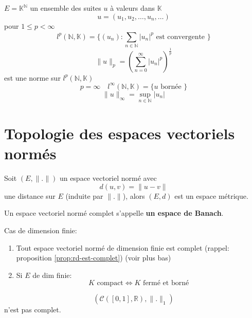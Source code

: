 \documentclass[a4paper]{report}
\newcommand\N{\ensuremath{\mathbb{N}}}
\newcommand\R{\ensuremath{\mathbb{R}}}
\let\iff\Leftrightarrow
\theoremstyle{definition}
\begin{document}
\begin{eg}
    $E = \mathbb{K}^{\N}$ un ensemble des suites $u$ à valeurs dans  $\mathbb{K}$ 
    \[
    u = (u_1, u_2, \ldots, u_n, \ldots )
    \] 
    pour $1 \le p < \infty$
    \[
        l^{p}(\N, \mathbb{K}) = \{(u_n): \sum_{n \in \N}^{} |u_n|^{p} \text{ est convergente } \}
    \] 
    \[
        \|u\|_p = \left( \sum_{n=0}^{\infty} |u_n|^{p} \right)^{\frac{1}{p}}
    \] 
    est une norme sur $l^{p}(\N, \mathbb{K})$
    \[
        p = \infty \quad l^{\infty}(\N, \mathbb{K}) = \{u \text{ bornée } \}
    \] 
    \[
        \|u\|_{\infty} = \sup_{n \in \N} |u_n|
    \] 
\end{eg}
\section{Topologie des espaces vectoriels normés}
\begin{prop}
    Soit $(E, \| . \|)$ un espace vectoriel normé avec 
     \[
    d(u, v) = \|u - v\|
    \] 
    une distance sur $E$ (induite par $\| . \|$), alors  $(E, d)$ est un espace métrique.
\end{prop}
\begin{definition}
    Un espace vectoriel normé complet s'appelle \textbf{un espace de Banach}.
\end{definition}
Cas de dimension finie:
\begin{enumerate}
    \item Tout espace vectoriel normé de dimension finie est complet (rappel: proposition \ref{prop:rd-est-complet}) (voir plus bas)
    \item Si $E$ de dim finie:
         \[
        K \text{ compact} \iff K \text{ fermé et borné }
        \] 
\end{enumerate}
\begin{lemma}
   \[
       \left( \mathcal{C}([0, 1], \R), \|.\|_1 \right) 
   \]  
   n'est pas complet.
\end{lemma}
\end{document}
